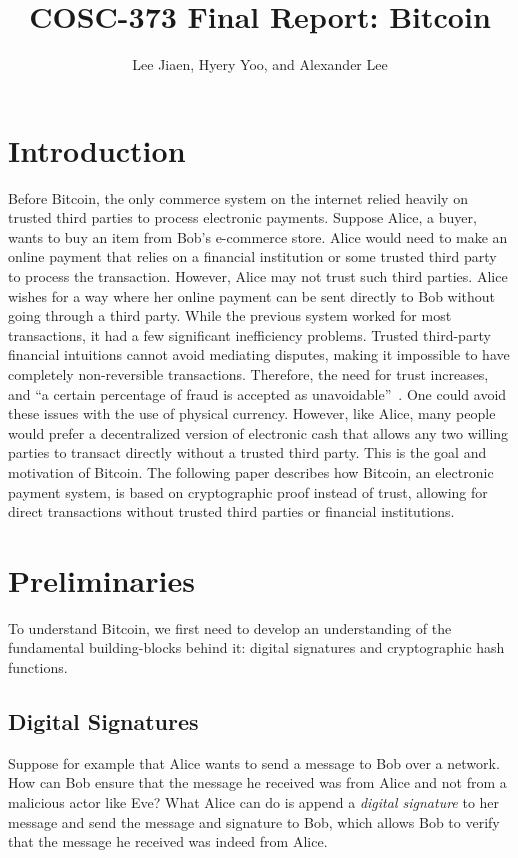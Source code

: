 \documentclass{article}
\title{COSC-373 Final Report: Bitcoin}
\author{Lee Jiaen, Hyery Yoo, and Alexander Lee}
\begin{document}
\maketitle

\section{Introduction}
Before Bitcoin, the only commerce system on the internet relied heavily on
trusted third parties to process electronic payments. Suppose Alice, a buyer,
wants to buy an item from Bob's e-commerce store. Alice would need to make an
online payment that relies on a financial institution or some trusted third
party to process the transaction. However, Alice may not trust such third
parties. Alice wishes for a way where her online payment can be sent directly to
Bob without going through a third party. While the previous system worked for
most transactions, it had a few significant inefficiency problems. Trusted
third-party financial intuitions cannot avoid mediating disputes, making it
impossible to have completely non-reversible transactions. Therefore, the need
for trust increases, and ``a certain percentage of fraud is accepted as
unavoidable''~\citep{Nakamoto08}. One could avoid these issues with the use of
physical currency. However, like Alice, many people would prefer a decentralized
version of electronic cash that allows any two willing parties to transact
directly without a trusted third party. This is the goal and motivation of
Bitcoin. The following paper describes how Bitcoin, an electronic payment
system, is based on cryptographic proof instead of trust, allowing for direct
transactions without trusted third parties or financial institutions.

\section{Preliminaries}

To understand Bitcoin, we first need to develop an understanding of the
fundamental building-blocks behind it: digital signatures and cryptographic hash
functions.

\subsection{Digital Signatures}

Suppose for example that Alice wants to send a message to Bob over a network.
How can Bob ensure that the message he received was from Alice and not from a
malicious actor like Eve? What Alice can do is append a \emph{digital signature}
to her message and send the message and signature to Bob, which allows Bob to
verify that the message he received was indeed from Alice.
\end{document}
